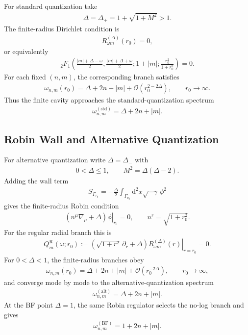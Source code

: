 \documentclass[11pt]{article}
\newcommand{\dd}{\mathrm{d}}
\newcommand{\pd}{\partial}
\begin{document}
For standard quantization take
\begin{align}
\Delta=\Delta_+=1+\sqrt{1+M^2}>1 .
\end{align}
The finite-radius Dirichlet condition is
\begin{align}
R_{\omega m}^{(\Delta)}(r_0)=0,
\end{align}
or equivalently
\begin{align}
{}_2F_1\!\left(
\frac{|m|+\Delta-\omega}{2},
\frac{|m|+\Delta+\omega}{2};
1+|m|;
\frac{r_0^2}{1+r_0^2}
\right)=0 .
\end{align}
For each fixed \((n,m)\), the corresponding branch satisfies
\begin{align}
\omega_{n,m}(r_0)
=\Delta+2n+|m|+\mathcal{O}(r_0^{2-2\Delta}),
\qquad r_0\to\infty .
\end{align}
Thus the finite cavity approaches the standard-quantization spectrum
\begin{align}
\omega_{n,m}^{(\mathrm{std})}=\Delta+2n+|m|.
\end{align}

\subsection{Robin Wall and Alternative Quantization}

For alternative quantization write \(\Delta=\Delta_-\) with
\begin{align}
0<\Delta\le1,\qquad M^2=\Delta(\Delta-2).
\end{align}
Adding the wall term
\begin{align}
S_{\Gamma_{r_0}}=-\frac{\Delta}{2}\int_{\Gamma_{r_0}}\dd^2x
\sqrt{-\gamma}\,\phi^2
\end{align}
gives the finite-radius Robin condition
\begin{align}
\left.(n^\mu\nabla_\mu+\Delta)\phi\right|_{r_0}=0,
\qquad n^r=\sqrt{1+r_0^2}.
\end{align}
For the regular radial branch this is
\begin{align}
Q_m^{\mathrm R}(\omega;r_0)
:=\left.\left(\sqrt{1+r^2}\,\pd_r+\Delta\right)
R_{\omega m}^{(\Delta)}(r)\right|_{r=r_0}=0 .
\end{align}
For \(0<\Delta<1\), the finite-radius branches obey
\begin{align}
\omega_{n,m}(r_0)
=\Delta+2n+|m|+\mathcal{O}(r_0^{-2\Delta}),
\qquad r_0\to\infty ,
\end{align}
and converge mode by mode to the alternative-quantization spectrum
\begin{align}
\omega_{n,m}^{(\mathrm{alt})}=\Delta+2n+|m|.
\end{align}
At the BF point \(\Delta=1\), the same Robin regulator selects the no-log
branch and gives
\begin{align}
\omega_{n,m}^{(\mathrm{BF})}=1+2n+|m|.
\end{align}
\end{document}
